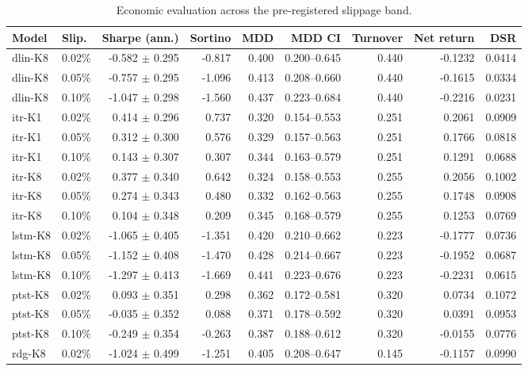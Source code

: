 \begin{table}[!t]
\centering
\caption{Economic evaluation across the pre-registered slippage band.}
\label{tab:economics}
\begin{tabular}{llrrrrrrr}
\toprule
Model & Slip. & Sharpe (ann.) & Sortino & MDD & MDD CI & Turnover & Net return & DSR \\
\midrule
dlin-K8 & 0.02\% & -0.582 $\pm$ 0.295 & -0.817 & 0.400 & 0.200--0.645 & 0.440 & -0.1232 & 0.0414 \\
dlin-K8 & 0.05\% & -0.757 $\pm$ 0.295 & -1.096 & 0.413 & 0.208--0.660 & 0.440 & -0.1615 & 0.0334 \\
dlin-K8 & 0.10\% & -1.047 $\pm$ 0.298 & -1.560 & 0.437 & 0.223--0.684 & 0.440 & -0.2216 & 0.0231 \\
itr-K1 & 0.02\% & 0.414 $\pm$ 0.296 & 0.737 & 0.320 & 0.154--0.553 & 0.251 & 0.2061 & 0.0909 \\
itr-K1 & 0.05\% & 0.312 $\pm$ 0.300 & 0.576 & 0.329 & 0.157--0.563 & 0.251 & 0.1766 & 0.0818 \\
itr-K1 & 0.10\% & 0.143 $\pm$ 0.307 & 0.307 & 0.344 & 0.163--0.579 & 0.251 & 0.1291 & 0.0688 \\
itr-K8 & 0.02\% & 0.377 $\pm$ 0.340 & 0.642 & 0.324 & 0.158--0.553 & 0.255 & 0.2056 & 0.1002 \\
itr-K8 & 0.05\% & 0.274 $\pm$ 0.343 & 0.480 & 0.332 & 0.162--0.563 & 0.255 & 0.1748 & 0.0908 \\
itr-K8 & 0.10\% & 0.104 $\pm$ 0.348 & 0.209 & 0.345 & 0.168--0.579 & 0.255 & 0.1253 & 0.0769 \\
lstm-K8 & 0.02\% & -1.065 $\pm$ 0.405 & -1.351 & 0.420 & 0.210--0.662 & 0.223 & -0.1777 & 0.0736 \\
lstm-K8 & 0.05\% & -1.152 $\pm$ 0.408 & -1.470 & 0.428 & 0.214--0.667 & 0.223 & -0.1952 & 0.0687 \\
lstm-K8 & 0.10\% & -1.297 $\pm$ 0.413 & -1.669 & 0.441 & 0.223--0.676 & 0.223 & -0.2231 & 0.0615 \\
ptst-K8 & 0.02\% & 0.093 $\pm$ 0.351 & 0.298 & 0.362 & 0.172--0.581 & 0.320 & 0.0734 & 0.1072 \\
ptst-K8 & 0.05\% & -0.035 $\pm$ 0.352 & 0.088 & 0.371 & 0.178--0.592 & 0.320 & 0.0391 & 0.0953 \\
ptst-K8 & 0.10\% & -0.249 $\pm$ 0.354 & -0.263 & 0.387 & 0.188--0.612 & 0.320 & -0.0155 & 0.0776 \\
rdg-K8 & 0.02\% & -1.024 $\pm$ 0.499 & -1.251 & 0.405 & 0.208--0.647 & 0.145 & -0.1157 & 0.0990 \\

\end{tabular}
\end{table}
